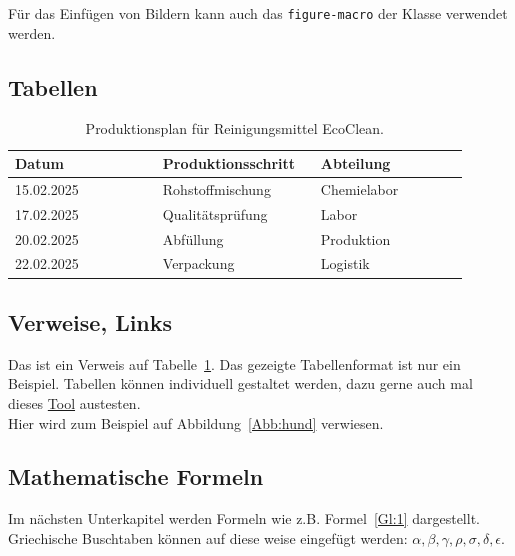         Für das Einfügen von Bildern kann auch das \verb|figure-macro| der Klasse verwendet werden.
        


    \clearpage
    \subsection{Tabellen}

        \begin{table}[!htbp]
                \centering
                \begin{tabular}{| p{0.3\linewidth} | p{0.3\linewidth} | p{0.3\linewidth} |}\hline
                Datum & Produktionsschritt & Abteilung\\\hline
                15.02.2025 & Rohstoffmischung & Chemielabor\\
                17.02.2025 & Qualitätsprüfung & Labor\\
                20.02.2025 & Abfüllung & Produktion\\
                22.02.2025 & Verpackung & Logistik\\\hline
                \end{tabular}
                \caption{Produktionsplan für Reinigungsmittel \glqq{}EcoClean\grqq{}.}\label{tab:1}
            \end{table}


    \subsection{Verweise, Links}
        Das ist ein Verweis auf Tabelle~\ref{tab:1}. Das gezeigte Tabellenformat ist nur ein Beispiel.
        Tabellen können individuell gestaltet werden, dazu gerne auch mal dieses \hyperref{https://www.tablesgenerator.com/}{category}{name}{Tool} austesten.\\

        Hier wird zum Beispiel auf Abbildung~\ref{Abb:hund} verwiesen.\\


    \subsection{Mathematische Formeln}
    Im nächsten Unterkapitel werden Formeln wie z.B. Formel~\ref{Gl:1} dargestellt.
    Griechische Buschtaben können auf diese weise eingefügt werden: 
    $\alpha, \beta, \gamma, \rho, \sigma, \delta, \epsilon$.

